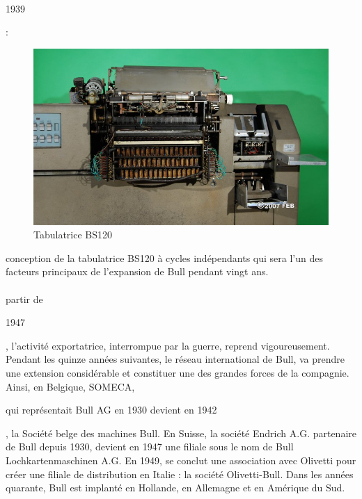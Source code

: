 \documentclass{article}
\begin{document}
		\paragraph{}
		\begin{bf}1939\end{bf}: \newline{}
		\begin{figure}
		\includegraphics[scale=0.1]{tabulatrice_bs120.jpg}
		\caption{Tabulatrice BS120}
		\end{figure}
		conception de la tabulatrice BS120 à cycles indépendants qui sera l'un des facteurs 
		principaux de l'expansion de Bull pendant vingt ans.
		\paragraph{}
		partir de \begin{bf}1947\end{bf}, l'activité exportatrice, interrompue par la guerre, reprend vigoureusement. 
		Pendant les quinze années suivantes, le réseau international de Bull, va prendre une extension considérable et 
		constituer une des grandes forces de la compagnie. Ainsi, en Belgique, SOMECA, \begin{bf}qui représentait Bull AG en 
		1930 devient en 1942\end{bf}, la Société belge des machines Bull. En Suisse, la société Endrich A.G. partenaire de 
		Bull depuis 1930, devient en 1947 une filiale sous le nom de Bull Lochkartenmaschinen A.G. En 1949, se conclut une 
		association avec Olivetti pour créer une filiale de distribution en Italie : la société Olivetti-Bull. Dans les années 
		quarante, Bull est implanté en Hollande, en Allemagne et en Amérique du Sud.
\end{document}
